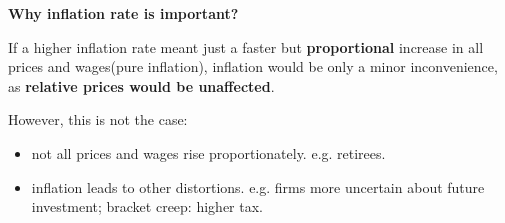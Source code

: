 \documentclass[11pt, a4paper]{ECON2123}
\begin{document}
\begin{spacing}{1.5}
    {\bf Why inflation rate is important?}

    If a higher inflation rate meant just a faster but {\bf proportional} 
    increase in all prices and wages(pure inflation), inflation would be 
    only a minor inconvenience, as {\bf relative prices would be unaffected}.

    However, this is not the case:
    \begin{itemize}
        \item not all prices and wages rise proportionately. e.g. retirees.
        \item inflation leads to other distortions. e.g. firms more uncertain 
        about future investment; bracket creep: higher tax.
    \end{itemize}
\end{spacing}
\end{document}
